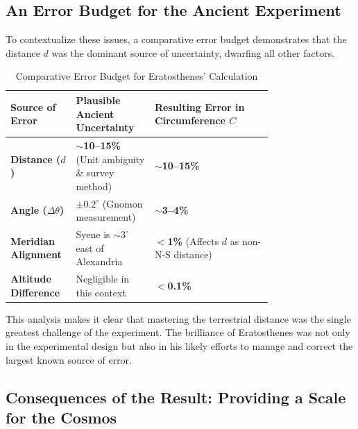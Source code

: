 \documentclass[11pt]{article}
\begin{document}
\subsection{An Error Budget for the Ancient Experiment}

To contextualize these issues, a comparative error budget demonstrates that the distance $d$ was the dominant source of uncertainty, dwarfing all other factors.

\begin{table}[htbp]
\centering
\caption{Comparative Error Budget for Eratosthenes' Calculation}
\label{tab:error_budget}
\small
\begin{tabular}{@{}lp{0.3\linewidth}p{0.45\linewidth}@{}}
\toprule
\textbf{Source of Error} & \textbf{Plausible Ancient Uncertainty} & \textbf{Resulting Error in Circumference $C$} \\
\midrule
\textbf{Distance ($d$)} & \textbf{$\sim$10--15\%} (Unit ambiguity \& survey method) & \textbf{$\sim$10--15\%} \\
\addlinespace
\textbf{Angle ($\Delta\theta$)} & \textbf{$\pm0.2^{\circ}$} (Gnomon measurement) & \textbf{$\sim$3--4\%} \\
\addlinespace
\textbf{Meridian Alignment} & Syene is $\sim$$3^{\circ}$ east of Alexandria & \textbf{$<$1\%} (Affects $d$ as non-N-S distance) \\
\addlinespace
\textbf{Altitude Difference} & Negligible in this context & \textbf{$<$0.1\%} \\
\bottomrule
\end{tabular}
\end{table}

This analysis makes it clear that mastering the terrestrial distance was the single greatest challenge of the experiment. The brilliance of Eratosthenes was not only in the experimental design but also in his likely efforts to manage and correct the largest known source of error.

\subsection{Consequences of the Result: Providing a Scale for the Cosmos}
\end{document}
